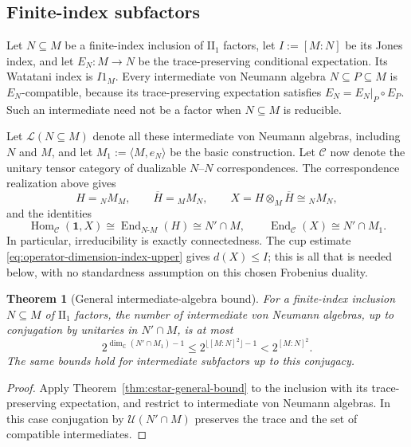 \documentclass[11pt]{amsart}
\newtheorem{theorem}{Theorem}[section]
\theoremstyle{definition}
\theoremstyle{remark}
\newcommand{\C}{\mathcal C}
\newcommand{\one}{\mathbf 1}
\newcommand{\CC}{\mathbb C}
\DeclareMathOperator{\Hom}{Hom}
\DeclareMathOperator{\End}{End}
\begin{document}
\subsection{Finite-index subfactors}

Let $N\subseteq M$ be a finite-index inclusion of $\mathrm{II}_1$ factors,
let $I:=[M:N]$ be its Jones index, and let $E_N:M\to N$ be the
trace-preserving conditional expectation.  Its Watatani index is $I1_M$.
Every intermediate von Neumann algebra $N\subseteq P\subseteq M$ is
$E_N$-compatible, because its trace-preserving expectation satisfies
$E_N=E_N|_P\circ E_P$.  Such an intermediate need not be a factor when
$N\subseteq M$ is reducible.

Let $\mathcal L(N\subseteq M)$ denote all these intermediate von
Neumann algebras, including $N$ and $M$, and let
$M_1:=\langle M,e_N\rangle$ be the basic construction.
Let $\C$ now denote the unitary tensor category of dualizable
$N$--$N$ correspondences.  The correspondence realization above gives
\begin{equation}\label{eq:canonical-unitary-frobenius}
 H={}_NM_M,\qquad \overline H={}_MM_N,\qquad
 X=H\otimes_M\overline H\cong{}_NM_N,
\end{equation}
and the identities
\begin{equation}\label{eq:end-relative-commutant}
 \Hom_{\C}(\one,X)\cong\End_{N\text{-}M}(H)\cong N'\cap M,
 \qquad\End_{\C}(X)\cong N'\cap M_1.
\end{equation}
In particular, irreducibility is exactly connectedness.  The cup estimate
\eqref{eq:operator-dimension-index-upper} gives $d(X)\leq I$; this is all
that is needed below, with no standardness assumption on this chosen
Frobenius duality.

\begin{theorem}[General intermediate-algebra bound]
\label{thm:subfactor-general-bound}
For a finite-index inclusion $N\subseteq M$ of $\mathrm{II}_1$ factors,
the number of intermediate von Neumann algebras, up to conjugation by
unitaries in $N'\cap M$, is at most
\[
 2^{\dim_{\CC}(N'\cap M_1)-1}
 \leq2^{\lfloor[M:N]^2\rfloor-1}<2^{[M:N]^2}.
\]
The same bounds hold for intermediate subfactors up to this conjugacy.
\end{theorem}

\begin{proof}
Apply Theorem~\ref{thm:cstar-general-bound} to the inclusion with its
trace-preserving expectation, and restrict to intermediate von Neumann
algebras.  In this case conjugation by $\mathcal U(N'\cap M)$ preserves
the trace and the set of compatible intermediates.
\end{proof}
\end{document}
